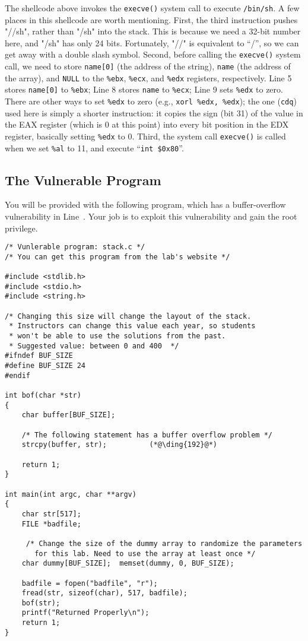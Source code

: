 The shellcode above invokes the \texttt{execve()} system call to execute \texttt{/bin/sh}.
A few places in this shellcode are worth mentioning. First, 
the third instruction pushes "//sh", rather than "/sh" into the 
stack. This is because we need a 32-bit number here, and "/sh" 
has only 24 bits. Fortunately, "//" is equivalent to ``/'', so we can get 
away with a double slash symbol. Second, before calling the {\tt execve()}
system call, we need to store {\tt name[0]} (the address of the string), 
{\tt name} (the address of the array), and {\tt NULL} to
the {\tt \%ebx}, {\tt \%ecx}, and {\tt \%edx} registers, respectively. 
Line 5 stores {\tt name[0]} to {\tt \%ebx}; 
Line 8 stores {\tt name} to    {\tt \%ecx}; 
Line 9 sets {\tt \%edx} to zero. There are other ways to set {\tt \%edx}
to zero (e.g., {\tt xorl \%edx, \%edx}); the one ({\tt cdq}) used here
is simply a shorter instruction: it copies the sign (bit 31) of the value in the EAX
register (which is 0 at this point) into every bit position in the EDX
register, basically setting {\tt \%edx} to 0.
Third, the system call {\tt execve()} is called when we set {\tt \%al} to
11, and execute ``{\tt int \$0x80}''.



\subsection{The Vulnerable Program}

You will be provided with the following program, which has 
a buffer-overflow vulnerability in Line~. Your job
is to exploit this vulnerability and gain the root privilege. 

\begin{lstlisting}
/* Vunlerable program: stack.c */
/* You can get this program from the lab's website */

#include <stdlib.h>
#include <stdio.h>
#include <string.h>

/* Changing this size will change the layout of the stack.
 * Instructors can change this value each year, so students
 * won't be able to use the solutions from the past.
 * Suggested value: between 0 and 400  */
#ifndef BUF_SIZE
#define BUF_SIZE 24
#endif

int bof(char *str)
{
    char buffer[BUF_SIZE];

    /* The following statement has a buffer overflow problem */ 
    strcpy(buffer, str);          (*@\ding{192}@*)

    return 1;
}

int main(int argc, char **argv)
{
    char str[517];
    FILE *badfile;

     /* Change the size of the dummy array to randomize the parameters
       for this lab. Need to use the array at least once */
    char dummy[BUF_SIZE];  memset(dummy, 0, BUF_SIZE); 

    badfile = fopen("badfile", "r");
    fread(str, sizeof(char), 517, badfile);
    bof(str);
    printf("Returned Properly\n");
    return 1;
}
\end{lstlisting}

